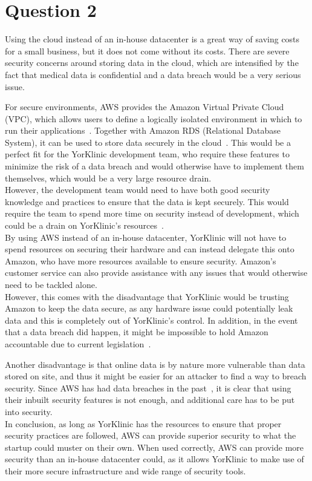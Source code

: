 \documentclass[11pt]{article}
\begin{document}
 \section*{Question 2}
Using the cloud instead of an in-house datacenter is a great way of saving costs for a small business, but it does not come without its costs. There are severe security concerns around storing data in the cloud, which are intensified by the fact that medical data is confidential and a data breach would be a very serious issue.

For secure environments, AWS provides the Amazon Virtual Private Cloud (VPC), which allows users to define a logically isolated environment in which to run their applications~\cite{vpc}. Together with Amazon RDS (Relational Database System), it can be used to store data securely in the cloud~\cite{rds}. This would be a perfect fit for the YorKlinic development team, who require these features to minimize the risk of a data breach and would otherwise have to implement them themselves, which would be a very large resource drain.\\
    
However, the development team would need to have both good security knowledge and practices to ensure that the data is kept securely. This would require the team to spend more time on security instead of development, which could be a drain on YorKlinic's resources~\cite{altoncloud}.\\

By using AWS instead of an in-house datacenter, YorKlinic will not have to spend resources on securing their hardware and can instead delegate this onto Amazon, who have more resources available to ensure security. Amazon's customer service can also provide assistance with any issues that would otherwise need to be tackled alone.\\

However, this comes with the disadvantage that YorKlinic would be trusting Amazon to keep the data secure, as any hardware issue could potentially leak data and this is completely out of YorKlinic's control. In addition, in the event that a data breach did happen, it might be impossible to hold Amazon accountable due to current legislation~\cite{cloudrisk}.

Another disadvantage is that online data is by nature more vulnerable than data stored on site, and thus it might be easier for an attacker to find a way to breach security. Since AWS has had data breaches in the past~\cite{breach}, it is clear that using their inbuilt security features is not enough, and additional care has to be put into security.\\

In conclusion, as long as YorKlinic has the resources to ensure that proper security practices are followed, AWS can provide superior security to what the startup could muster on their own. When used correctly, AWS can provide more security than an in-house datacenter could, as it allows YorKlinic to make use of their more secure infrastructure and wide range of security tools.
\end{document}
